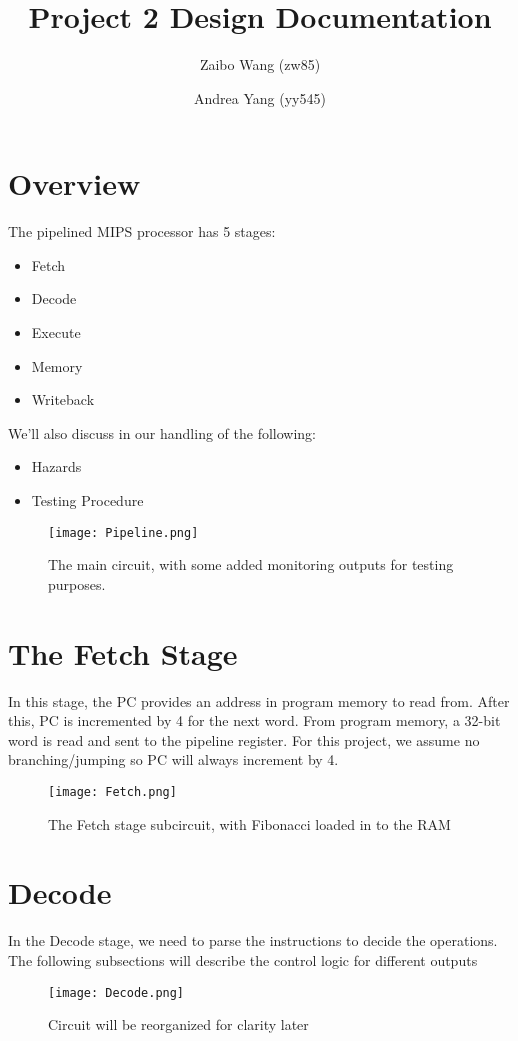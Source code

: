 \documentclass[10pt]{article}
\title{Project 2 Design Documentation}
\author{Zaibo Wang (zw85) \and Andrea Yang (yy545)}
\begin{document}
\maketitle

\section{Overview}

The pipelined MIPS processor has 5 stages:
\begin{itemize}
    \item Fetch
    \item Decode
    \item Execute
    \item Memory
    \item Writeback
\end{itemize}
We'll also discuss in our handling of the following:
\begin{itemize}
    \item Hazards
    \item Testing Procedure
\end{itemize}
\begin{figure}[h]
    \texttt{[image: Pipeline.png]}
    \caption{The main circuit, with some added monitoring outputs for testing purposes.}
\end{figure}


\newpage
\section{The Fetch Stage}
In this stage, the PC provides an address in program memory to read from. After this, PC is incremented by 4 for the next word. From program memory, a 32-bit word is read and sent to the pipeline register. For this project, we assume no branching/jumping so PC will always increment by 4. 
\begin{figure}[h]
    \texttt{[image: Fetch.png]}
    \caption{The Fetch stage subcircuit, with Fibonacci loaded in to the RAM}
\end{figure}

\newpage
\section{Decode}
In the Decode stage, we need to parse the instructions to decide the operations. The following subsections will describe the control logic for different outputs

\begin{figure}[h]
    \texttt{[image: Decode.png]}
    \caption{Circuit will be reorganized for clarity later}
\end{figure}
\end{document}
